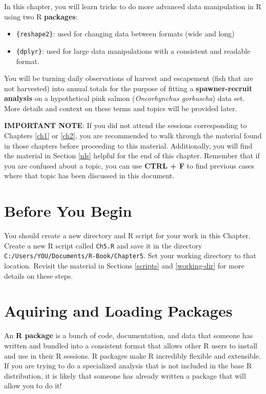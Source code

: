 \documentclass[]{book}
\providecommand{\tightlist}{%
  \setlength{\itemsep}{0pt}\setlength{\parskip}{0pt}}
\theoremstyle{definition}
\theoremstyle{definition}
\theoremstyle{definition}
\theoremstyle{remark}
\begin{document}
In this chapter, you will learn tricks to do more advanced data
manipulation in R using two R \textbf{packages}:

\begin{itemize}
\tightlist
\item
  \texttt{\{reshape2\}}: used for changing data between formats (wide
  and long)
\item
  \texttt{\{dplyr\}}: used for large data manipulations with a
  consistent and readable format.
\end{itemize}

You will be turning daily observations of harvest and escapement (fish
that are not harvested) into annual totals for the purpose of fitting a
\textbf{spawner-recruit analysis} on a hypothetical pink salmon
(\emph{Oncorhynchus gorbuscha}) data set. More details and context on
these terms and topics will be provided later.

\textbf{IMPORTANT NOTE}: If you did not attend the sessions
corresponding to Chapters \ref{ch1} or \ref{ch2}, you are recommended to
walk through the material found in those chapters before proceeding to
this material. Additionally, you will find the material in Section
\ref{nls} helpful for the end of this chapter. Remember that if you are
confused about a topic, you can use \textbf{CTRL + F} to find previous
cases where that topic has been discussed in this document.

\section*{Before You Begin}\label{before-you-begin-3}

You should create a new directory and R script for your work in this
Chapter. Create a new R script called \texttt{Ch5.R} and save it in the
directory \texttt{C:/Users/YOU/Documents/R-Book/Chapter5}. Set your
working directory to that location. Revisit the material in Sections
\ref{scripts} and \ref{working-dir} for more details on these steps.

\section{Aquiring and Loading
Packages}\label{aquiring-and-loading-packages}

An \textbf{R package} is a bunch of code, documentation, and data that
someone has written and bundled into a consistent format that allows
other R users to install and use in their R sessions. R packages make R
incredibly flexible and extensible. If you are trying to do a
specialized analysis that is not included in the base R distribution, it
is likely that someone has already written a package that will allow you
to do it!
\end{document}
